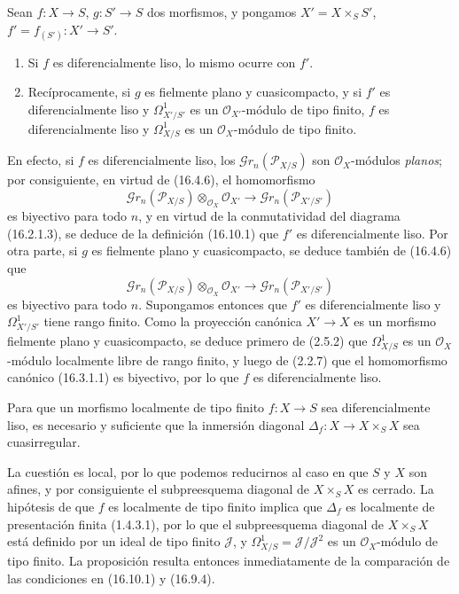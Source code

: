 \begin{proposition}[16.10.4]
\label{IV.16.10.4}
Sean $f:X\to S$, $g:S'\to S$ dos morfismos, y pongamos
$X'=X\times_S S'$, $f'=f_{(S')}:X'\to S'$.
\begin{enumerate}
  \item[\textup{(i)}] Si $f$ es diferencialmente liso, lo mismo ocurre con $f'$.
  \item[\textup{(ii)}] Recíprocamente, si $g$ es fielmente plano y cuasicompacto, y si
  $f'$ es diferencialmente liso y $\varOmega_{X'/S'}^1$ es un
  $\mathcal{O}_{X'}$-módulo de tipo finito, $f$ es diferencialmente liso y
  $\varOmega_{X/S}^1$ es un $\mathcal{O}_X$-módulo de tipo finito.
\end{enumerate}
\end{proposition}

En efecto, si $f$ es diferencialmente liso, los
$\mathscr{G}r_n(\mathscr{P}_{X/S})$ son $\mathcal{O}_X$-módulos
\emph{planos}; por consiguiente, en virtud de (16.4.6), el homomorfismo
\[
  \mathscr{G}r_n(\mathscr{P}_{X/S})\otimes_{\mathcal{O}_X}\mathcal{O}_{X'}
  \longrightarrow\mathscr{G}r_n(\mathscr{P}_{X'/S'})
\]
es biyectivo para todo $n$, y en virtud de la conmutatividad del diagrama
(16.2.1.3), se deduce de la definición (16.10.1) que $f'$ es
diferencialmente liso. Por otra parte, si $g$ es fielmente plano y
cuasicompacto, se deduce también de (16.4.6) que
\[
  \mathscr{G}r_n(\mathscr{P}_{X/S})\otimes_{\mathcal{O}_X}\mathcal{O}_{X'}
  \longrightarrow\mathscr{G}r_n(\mathscr{P}_{X'/S'})
\]
es biyectivo para todo $n$. Supongamos entonces que $f'$ es diferencialmente liso y
$\varOmega_{X'/S'}^1$ tiene rango finito. Como la proyección canónica $X'\to X$ es
un morfismo fielmente plano y cuasicompacto, se deduce primero de (2.5.2)
que $\varOmega_{X/S}^1$ es un $\mathcal{O}_X$-módulo localmente libre de rango
finito, y luego de (2.2.7) que el homomorfismo canónico (16.3.1.1) es biyectivo,
por lo que $f$ es diferencialmente liso.

\begin{proposition}[16.10.5]
\label{IV.16.10.5}
Para que un morfismo localmente de tipo finito $f:X\to S$ sea
diferencialmente liso, es necesario y suficiente que la inmersión diagonal
$\Delta_f:X\to X\times_S X$ sea cuasirregular.
\end{proposition}


La cuestión es local, por lo que podemos reducirnos al caso en que $S$ y $X$
son afines, y por consiguiente el subpreesquema diagonal de $X\times_S X$ es
cerrado. La hipótesis de que $f$ es localmente de tipo finito implica que
$\Delta_f$ es localmente de presentación finita (1.4.3.1), por lo que el
subpreesquema diagonal de $X\times_S X$ está definido por un ideal de tipo
finito $\mathscr J$, y $\varOmega_{X/S}^1=\mathscr J/\mathscr J^2$ es un
$\mathcal{O}_X$-módulo de tipo finito. La proposición resulta entonces
inmediatamente de la comparación de las condiciones en (16.10.1) y (16.9.4).


